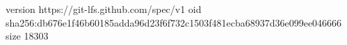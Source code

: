version https://git-lfs.github.com/spec/v1
oid sha256:db676e1f46b60185adda96d23f6f732c1503f481ecba68937d36e099ee046666
size 18303
